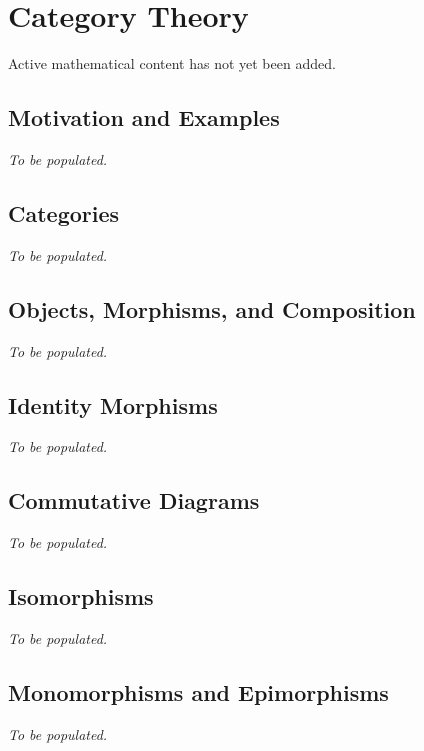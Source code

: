 \chapter{Category Theory}


\begin{tcolorbox}[
  colback=gray!6,
  colframe=gray!40,
  arc=2pt,
  left=8pt, right=8pt, top=6pt, bottom=6pt,
  title={\small\textbf{Status: Planned}},
  fonttitle=\small\bfseries
]
Active mathematical content has not yet been added.
\end{tcolorbox}

\section{Motivation and Examples}
\textit{To be populated.}

\section{Categories}
\textit{To be populated.}

\section{Objects, Morphisms, and Composition}
\textit{To be populated.}

\section{Identity Morphisms}
\textit{To be populated.}

\section{Commutative Diagrams}
\textit{To be populated.}

\section{Isomorphisms}
\textit{To be populated.}

\section{Monomorphisms and Epimorphisms}
\textit{To be populated.}

